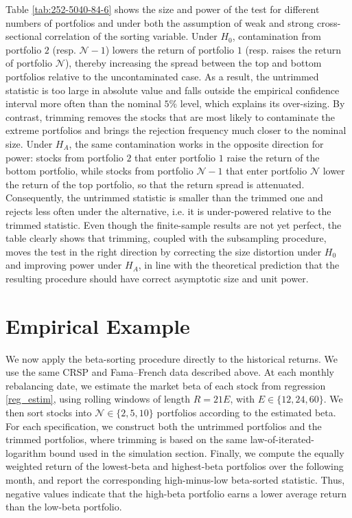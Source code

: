 Table \ref{tab:252-5040-84-6} shows the size and power of the test for different numbers of portfolios and under both the assumption of weak and strong cross-sectional correlation of the sorting variable. Under $H_0$, contamination from portfolio $2$ (resp. $\mathcal{N}-1$) lowers the return of portfolio $1$ (resp. raises the return of portfolio $\mathcal{N}$), thereby increasing the spread between the top and bottom portfolios relative to the uncontaminated case. As a result, the untrimmed statistic is too large in absolute value and falls outside the empirical confidence interval more often than the nominal $5\%$ level, which explains its over-sizing. By contrast, trimming removes the stocks that are most likely to contaminate the extreme portfolios and brings the rejection frequency much closer to the nominal size. Under $H_A$, the same contamination works in the opposite direction for power: stocks from portfolio $2$ that enter portfolio $1$ raise the return of the bottom portfolio, while stocks from portfolio $\mathcal{N}-1$ that enter portfolio $\mathcal{N}$ lower the return of the top portfolio, so that the return spread is attenuated. Consequently, the untrimmed statistic is smaller than the trimmed one and rejects less often under the alternative, i.e. it is under-powered relative to the trimmed statistic. Even though the finite-sample results are not yet perfect, the table clearly shows that trimming, coupled with the subsampling procedure, moves the test in the right direction by correcting the size distortion under $H_0$ and improving power under $H_A$, in line with the theoretical prediction that the resulting procedure should have correct asymptotic size and unit power.


 


\section{Empirical Example}
\label{Empirical Example}

We now apply the beta-sorting procedure directly to the historical returns. We use the same CRSP and Fama--French data described above. At each monthly rebalancing date, we estimate the market beta of each stock from regression \eqref{reg_estim}, using rolling windows of length $R=21E$, with $E \in \{12,24,60\}$. We then sort stocks into $\mathcal{N}\in\{2,5,10\}$ portfolios according to the estimated beta. For each specification, we construct both the untrimmed portfolios and the trimmed portfolios, where trimming is based on the same law-of-iterated-logarithm bound used in the simulation section. Finally, we compute the equally weighted return of the lowest-beta and highest-beta portfolios over the following month, and report the corresponding high-minus-low beta-sorted statistic. Thus, negative values indicate that the high-beta portfolio earns a lower average return than the low-beta portfolio.

